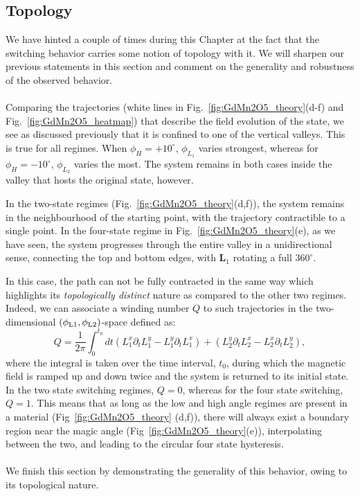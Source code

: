 \subsection{Topology \label{sec:GdMn2O5_topology}}
We have hinted a couple of times during this Chapter at the fact that the switching behavior carries some notion of topology with it.
We will sharpen our previous statements in this section and comment on the generality and robustness of the observed behavior.
\\\\
Comparing the trajectories (white lines in Fig.~\ref{fig:GdMn2O5_theory}(d-f) and Fig.~\ref{fig:GdMn2O5_heatmap}) that describe the field evolution of the state, we see as discussed previously that it is confined to one of the vertical valleys.
This is true for all regimes. When $\phi_H = +10^\circ$, $\phi_{L_1}$ varies strongest, whereas for $\phi_H = -10^\circ$, $\phi_{L_2}$ varies the most.
The system remains in both cases inside the valley that hosts the original state, however.

In the two-state regimes (Fig.~\ref{fig:GdMn2O5_theory}(d,f)), the system remains in the neighbourhood of the starting point, with the trajectory contractible to a single point. 
In the four-state regime in Fig.~\ref{fig:GdMn2O5_theory}(e), as we have seen, the system progresses through the entire valley in a unidirectional sense, connecting the top and bottom edges, with $\bm{L}_1$ rotating a full $360^\circ$.

In this case, the path can not be fully contracted in the same way which highlights its {\em  topologically distinct} nature as compared to the other two regimes.
Indeed, we can associate a winding number $Q$ to such trajectories in the two-dimensional $(\phi_{\rm L1},\phi_{\rm L2})$-space defined as:
\begin{equation}
Q=\frac{1}{2\pi}\int_0^{t_0} dt (L_1^x\partial_t L_1^y - L_1^y \partial_t L_1^x) + (L_2^y\partial_t L_2^x - L_2^x \partial_t L_2^y),
\end{equation}
where the integral is taken over the time interval, $t_0$, during which the magnetic field is ramped up and down twice and the system is returned to its initial state.
In the two state switching regimes, $Q  = 0$, whereas for the four state switching, $Q = 1$.
This means that as long as the low and high angle regimes are present in a material (Fig~\ref{fig:GdMn2O5_theory} (d,f)), there will always exist a boundary region near the magic angle (Fig~\ref{fig:GdMn2O5_theory}(e)), interpolating between the two, and leading to the circular four state hysteresis.
\\\\
We finish this section by demonstrating the generality of this behavior, owing to its topological nature.

